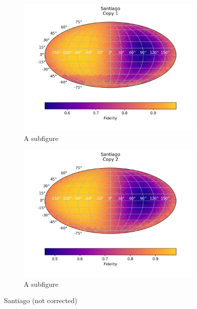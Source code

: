 \begin{figure}[H]
    \centering
    \begin{subfigure}{.5\textwidth}
      \centering
      \includegraphics[width=\textwidth]{Figures/Economical/IBM/FullSphere/results_santiago_copy1.png}
      \caption{A subfigure}
      \label{fig:ec_santiago_sphere_1}
    \end{subfigure}%
    \begin{subfigure}{.5\textwidth}
      \centering
      \includegraphics[width=\textwidth]{Figures/Economical/IBM/FullSphere/results_santiago_copy2.png}
      \caption{A subfigure}
      \label{fig:ec_santiago_sphere_2}
    \end{subfigure}
    \caption{Santiago (not corrected)}
    \label{fig:ec_santiago_sphere}
\end{figure}
\fi

